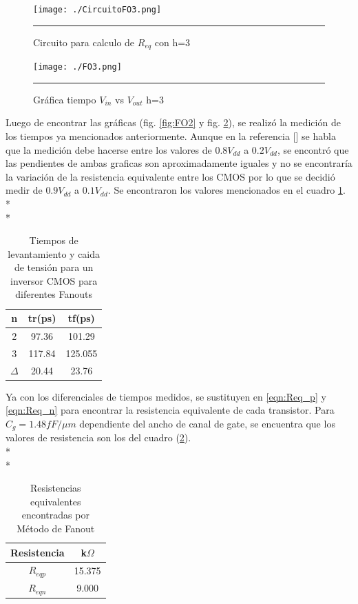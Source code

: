 \documentclass[12pt,a4paper]{article} %
\begin{document}
\begin{figure}[htbp]
\begin{center}
    \texttt{[image: ./CircuitoFO3.png]}
    \rule{35em}{0.5pt}
  \caption[Captura]{Circuito para calculo de $R_{eq}$ con h=3}
  \label{fig:CircuitoFO3}
  
\end{center}
\end{figure}

\begin{figure}[htbp]
  \begin{center}
    \texttt{[image: ./FO3.png]}
    \rule{35em}{0.5pt}
  \caption[Captura]{Gráfica tiempo $V_{in}$ vs $V_{out}$ h=3}
  \label{fig:FO3}
  \end{center}
\end{figure}

Luego de encontrar las gráficas (fig. \ref{fig:FO2} y fig. \ref{fig:FO3}), se realizó la medición de los tiempos ya mencionados anteriormente. Aunque en la referencia [] se habla que la medición debe hacerse entre los valores de $0.8V_{dd}$ a $0.2V_{dd}$, se encontró que las pendientes de ambas graficas son aproximadamente iguales y no se encontraría la variación de la resistencia equivalente entre los CMOS por lo que se decidió medir de $0.9V_{dd}$ a $0.1V_{dd}$. Se encontraron los valores mencionados en el cuadro \ref{table:tiempos}. \\*
\\*
\begin{table}\label{table:tiempos}
\begin{center}
\begin{tabular}{c||c||c}
n & tr(ps) & tf(ps)\\
\hline
\hline
2 & 97.36 & 101.29 \\
3 & 117.84 & 125.055 \\
$\Delta$ & 20.44 & 23.76\\
\hline
\end{tabular}
\caption{Tiempos de levantamiento y caida de tensión para un inversor CMOS para diferentes Fanouts}
\end{center}
\end{table}


Ya con los diferenciales de tiempos medidos, se sustituyen en \ref{eqn:Req_p} y \ref{eqn:Req_n} para encontrar la resistencia equivalente de cada transistor. Para $C_{g}=1.48 fF/\mu m$  dependiente del ancho de canal de gate, se encuentra que los valores de resistencia son los del cuadro (\ref{table:resistencias}). \\*
\\*
\begin{table}\label{table:resistencias}
\begin{center}
\begin{tabular}{c||c}
Resistencia & k$\Omega$\\
\hline
\hline
$R_{eqp}$ & 15.375 \\
$R_{eqn}$ & 9.000 \\
\hline
\end{tabular}
\caption{Resistencias equivalentes encontradas por Método de Fanout}
\end{center}
\end{table}
\end{document}
